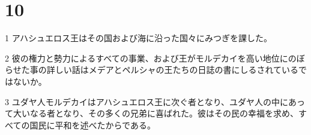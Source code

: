 \chapter{10}

\par 1 アハシュエロス王はその国および海に沿った国々にみつぎを課した。
\par 2 彼の権力と勢力によるすべての事業、および王がモルデカイを高い地位にのぼらせた事の詳しい話はメデアとペルシャの王たちの日誌の書にしるされているではないか。
\par 3 ユダヤ人モルデカイはアハシュエロス王に次ぐ者となり、ユダヤ人の中にあって大いなる者となり、その多くの兄弟に喜ばれた。彼はその民の幸福を求め、すべての国民に平和を述べたからである。


